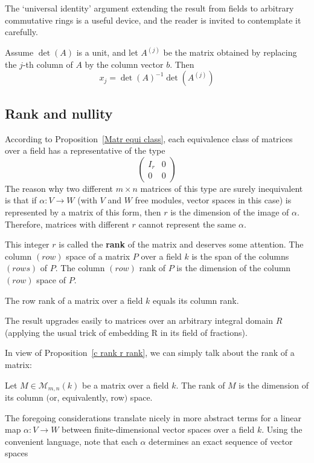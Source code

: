 The ‘universal identity’ argument extending the result from fields to arbitrary
commutative rings is a useful device, and the reader is invited to contemplate it
carefully.
\begin{proposition}
Assume $\det(A)$ is a unit, and let $A^{(j)}$ be the matrix obtained by replacing the $j$-th column of $A$ by the column vector $b$. Then
\[x_j=\det(A)^{-1}\det(A^{(j)})\]
\end{proposition}
\subsection{Rank and nullity}
According to Proposition~\ref{Matr equi class}, each equivalence class of matrices over a field has a representative of the type
\[\begin{pmatrix}
I_r&0\\
0&0
\end{pmatrix}\]
The reason why two different $m\times n$ matrices of this type are surely inequivalent is that if $\alpha:V\to W$ (with $V$ and $W$ free modules, vector spaces in this case) is represented by a matrix of this form, then $r$ is the dimension of the image of $\alpha$. Therefore, matrices with different $r$ cannot represent the same $\alpha$.\par
This integer $r$ is called the \textbf{rank} of the matrix and deserves some attention. The column $(row)$ space of a matrix $P$ over a field $k$ is the span of the columns $(rows)$ of $P$. The column $(row)$ rank of $P$ is the dimension of the column $(row)$ space of $P$.
\begin{proposition}\label{c rank r rank}
The row rank of a matrix over a field $k$ equals its column rank.
\end{proposition}
The result upgrades easily to matrices over an arbitrary integral domain $R$ (applying the usual trick of embedding R in its field of fractions).\par
In view of Proposition~\ref{c rank r rank}, we can simply talk about the rank of a matrix:
\begin{definition}
Let $M\in\mathcal{M}_{m,n}(k)$ be a matrix over a field $k$. The rank of $M$ is the dimension of its column $($or, equivalently, row$)$ space.
\end{definition}
The foregoing considerations translate nicely in more abstract terms for a linear map $\alpha:V\to W$ between finite-dimensional vector spaces over a field $k$. Using the convenient language, note that each $\alpha$ determines an exact sequence of vector spaces
